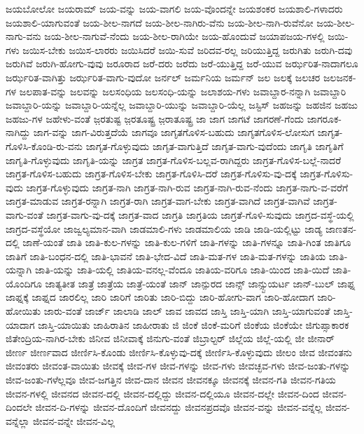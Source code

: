 {ಜಯಬೋಲೋ
ಜಯರಾಮ್
ಜಯ-ವನ್ನು
ಜಯ-ವಾಗಲಿ
ಜಯ-ವೊಂದನ್ನೇ
ಜಯಶಂಕರ
ಜಯಶಾಲಿ-ಗಳಾದರು
ಜಯಶಾಲಿ-ಯಾಗುವಂತೆ
ಜಯ-ಶೀಲ-ನಾಗದೆ
ಜಯ-ಶೀಲ-ನಾಗಿರು-ವೆನು
ಜಯ-ಶೀಲ-ನಾಗಿ-ರುವೆನೋ
ಜಯ-ಶೀಲ-ನಾಗು-ವನು
ಜಯ-ಶೀಲ-ನಾಗುವೆ-ನೆಂದು
ಜಯ-ಶೀಲ-ರಾಗಿಯೇ
ಜಯ-ಹೊಂದುವೆ
ಜಯಾಪಜಯ-ಗಳಲ್ಲಿ
ಜಯಿ-ಗಳು
ಜಯಿಸ-ಬೇಕು
ಜಯಿಸ-ಲಾರರು
ಜಯಿಸಿದರೆ
ಜಯಿ-ಸುವೆ
ಜರಿದವ-ರಲ್ಲ
ಜರಿಯುತ್ತಿದ್ದ
ಜರುಗಿತು
ಜರುಗಿ-ದವು
ಜರುಗಿವೆ
ಜರುಗಿ-ಹೋಗು-ವುವು
ಜರೂರಾದ
ಜರೆ-ದರು
ಜರೆದು
ಜರೆ-ಯುತ್ತಿದ್ದ
ಜರೆ-ಯುವ
ಜರ್ಝರಿತ-ನಾದಾಗಲೂ
ಜರ್ಝರಿತ-ವಾಗಿತ್ತು
ಜರ್ಝರಿತ-ವಾಗು-ವುದೋ
ಜರ್ನಲ್
ಜರ್ಮನಿಯ
ಜರ್ಮನ್
ಜಲ
ಜಲಕ್ಕೆ
ಜಲಚರ
ಜಲಜನಕ-ಗಳ
ಜಲಪಾತ-ವನ್ನು
ಜಲವನ್ನು
ಜಲಸಂಧಿಯ
ಜಲಸಂಧಿ-ಯನ್ನು
ಜಲಾಶಯ-ಗಳು
ಜವಾಬ್ದಾರ-ನನ್ನಾಗಿ
ಜವಾಬ್ದಾರಿ
ಜವಾಬ್ದಾರಿ-ಯನ್ನು
ಜವಾಬ್ದಾರಿ-ಯನ್ನೆಲ್ಲ
ಜವಾಬ್ದಾರಿ-ಯುನ್ನು
ಜವಾಬ್ದಾರಿ-ಯೆಲ್ಲ
ಜಸ್ಟಿಸ್
ಜಹಜನ್ನು
ಜಹಜಿನ
ಜಹಜು
ಜಹಜು-ಗಳ
ಜಹೇಳು-ವಂತೆ
ಜ಼ರತುಷ್ಟ
ಜ಼ರತೂಷ್ಟ್ರ
ಜ಼ರಾತೂಷ್ಟ್ರ
ಜಾ
ಜಾಗ
ಜಾಗಟೆ
ಜಾಗರಣೆ-ಗೆಂದು
ಜಾಗರೂಕ-ನಾಗಿದ್ದು
ಜಾಗ-ವನ್ನು
ಜಾಗ-ವಿರುತ್ತದೆಯೆ
ಜಾಗವೂ
ಜಾಗೃತಗೊಳಿಸ-ಬಹುದು
ಜಾಗೃತಗೊಳಿಸ-ಲೋಸುಗ
ಜಾಗೃತ-ಗೊಳಿಸಿ-ಕೊಂಡಿ-ರು-ವನು
ಜಾಗೃತ-ಗೊಳ್ಳುವುದು
ಜಾಗೃತ-ವಾಗುತ್ತಿದೆ
ಜಾಗೃತ-ವಾಗು-ವುದೆಂದು
ಜಾಗೃತಿ
ಜಾಗೃತಿಗೆ
ಜಾಗೃತಿ-ಗೊಳ್ಳುವುದು
ಜಾಗೃತಿ-ಯನ್ನು
ಜಾಗ್ರತ
ಜಾಗ್ರತ-ಗೊಳಿಸ-ಬಲ್ಲವ-ರಾಗಿದ್ದರು
ಜಾಗ್ರತ-ಗೊಳಿಸ-ಬಲ್ಲೆ-ನಾದರೆ
ಜಾಗ್ರತ-ಗೊಳಿಸ-ಬಹುದು
ಜಾಗ್ರತ-ಗೊಳಿಸ-ಬೇಕು
ಜಾಗ್ರತ-ಗೊಳಿಸಿ-ದರೆ
ಜಾಗ್ರತ-ಗೊಳಿಸು-ವು-ದಕ್ಕೆ
ಜಾಗ್ರತ-ಗೊಳಿಸು-ವುದು
ಜಾಗ್ರತ-ಗೊಳ್ಳುವುದು
ಜಾಗ್ರತ-ನಾಗಿ
ಜಾಗ್ರತ-ನಾಗಿ-ರುವ
ಜಾಗ್ರತ-ನಾಗಿ-ರುವ-ನೆಂದು
ಜಾಗ್ರತ-ನಾಗು-ವ-ವರೆಗೆ
ಜಾಗ್ರತ-ಮಾಡುವ
ಜಾಗ್ರತ-ರನ್ನಾಗಿ
ಜಾಗ್ರತ-ರಾಗಿ
ಜಾಗ್ರತ-ವಾಗ-ಬೇಕು
ಜಾಗ್ರತ-ವಾಗಿದೆ
ಜಾಗ್ರತ-ವಾಗಿವೆ
ಜಾಗ್ರತ-ವಾಗು-ವಂತೆ
ಜಾಗ್ರತ-ವಾಗು-ವು-ದಕ್ಕೆ
ಜಾಗ್ರತ-ವಾದ
ಜಾಗ್ರತಿ
ಜಾಗ್ರತಿಯ
ಜಾಗ್ರತೆ-ಗೊಳಿ-ಸುವುದು
ಜಾಗ್ರದ-ವಸ್ಥೆ-ಯಲ್ಲಿ
ಜಾಗ್ರದ-ವಸ್ಥೆಯೋ
ಜಾಜ್ವಲ್ಯಮಾನ-ವಾಗಿ
ಜಾಡಮಾಲಿ-ಗಳು
ಜಾಡಮಾಲಿಯ
ಜಾಡಿ
ಜಾಡಿ-ಯಲ್ಲಿಟ್ಟು
ಜಾಡ್ಯ
ಜಾಣತನ-ದಲ್ಲಿ
ಜಾಣೆ-ಯಂತೆ
ಜಾತಿ
ಜಾತಿ-ಕುಲ-ಗಳನ್ನು
ಜಾತಿ-ಕುಲ-ಗಳಿಗೆ
ಜಾತಿ-ಗಳನ್ನು
ಜಾತಿ-ಗಳನ್ನೂ
ಜಾತಿ-ಗಿಂತ
ಜಾತಿಗೂ
ಜಾತಿಗೆ
ಜಾತಿ-ಬಂಧನ-ದಲ್ಲಿ
ಜಾತಿ-ಭಾವನೆ
ಜಾತಿ-ಭೇದ-ವಿದೆ
ಜಾತಿ-ಮತ-ಗಳ
ಜಾತಿ-ಮತ-ಗಳನ್ನು
ಜಾತಿಯ
ಜಾತಿ-ಯನ್ನಾಗಿ
ಜಾತಿ-ಯನ್ನು
ಜಾತಿ-ಯಲ್ಲಿ
ಜಾತಿಯ-ವನಲ್ಲ-ವೆಂದೂ
ಜಾತಿಯ-ವರಿಗೂ
ಜಾತಿ-ಯಿಂದ
ಜಾತಿ-ಯಿದೆ
ಜಾತಿ-ಯೊಂದಿಗೂ
ಜಾತ್ಯತೀತ
ಜಾತ್ರೆ
ಜಾತ್ರೆಯ
ಜಾತ್ರೆ-ಯಂತೆ
ಜಾನ್
ಜಾನ್ಪುರದ
ಜಾನ್ಸ್
ಜಾನ್ಸ್ಟುಯರ್ಟ
ಜಾನ್-ಬುಲ್
ಜಾಫ್ನ
ಜಾಫ್ನಕ್ಕೆ
ಜಾಫ್ನದ
ಜಾರಲಿಲ್ಲ
ಜಾರಿ
ಜಾರಿಗೆ
ಜಾರಿತು
ಜಾರಿ-ಬಿದ್ದು
ಜಾರಿ-ಹೋಗು-ವಾಗ
ಜಾರಿ-ಹೋದಾಗ
ಜಾರಿ-ಹೋಯಿತು
ಜಾರು-ವಂತೆ
ಜಾರ್ಜ್
ಜಾಲಾಡಿ
ಜಾಲ್
ಜಾವ
ಜಾವದ
ಜಾಸ್ತಿ
ಜಾಸ್ತಿ-ಯಾಗಿ
ಜಾಸ್ತಿ-ಯಾಗುವಂತೆ
ಜಾಸ್ತಿ-ಯಾದಾಗ
ಜಾಸ್ತಿ-ಯಾಯಿತು
ಜಾಹಿರಾತಿನ
ಜಾಹೀರಾತು
ಜಿ
ಜಿಂಕೆ
ಜಿಂಕೆ-ಮರಿಗೆ
ಜಿಂಕೆಯ
ಜಿಂಕೆಯೇ
ಜಿಗುಪ್ಸಾಕಾರಕ
ಜಿತೇಂದ್ರಿಯ-ನಾಗಿರ-ಬೇಕು
ಜಿನೀವ
ಜಿನೀವಾಕ್ಕೆ
ಜಿನುಗು-ವಂತೆ
ಜಿಬ್ರಾಲ್ಟರ್
ಜಿಲ್ಲೆಯ
ಜಿಲ್ಲೆ-ಯಲ್ಲಿ
ಜೀ
ಜೀನಾರ್
ಜೀರ್ಣ
ಜೀರ್ಣವಾದ
ಜೀರ್ಣಿಸಿ-ಕೊಂಡು
ಜೀರ್ಣಿಸಿ-ಕೊಳ್ಳುವು-ದಕ್ಕೆ
ಜೀರ್ಣಿಸಿ-ಕೊಳ್ಳುವುದು
ಜೀಲಂ
ಜೀವ
ಜೀವಂತನು
ಜೀವಂತರು
ಜೀವಂತ-ವಾಯಿತು
ಜೀವಕ್ಕೆ
ಜೀವ-ಗಳ
ಜೀವ-ಗಳನ್ನು
ಜೀವ-ಗಳು
ಜೀವಚ್ಛವ-ಗಳು
ಜೀವ-ಜಂತು-ಗಳನ್ನು
ಜೀವ-ಜಂತು-ಗಳೆಲ್ಲವೂ
ಜೀವ-ಜಗತ್ತಿನ
ಜೀವ-ದಾನ
ಜೀವನ
ಜೀವನಕ್ಕೂ
ಜೀವನಕ್ಕೆ
ಜೀವನ-ಗತಿ
ಜೀವನ-ಗತಿಯ
ಜೀವನ-ಗಳಲ್ಲಿ
ಜೀವನದ
ಜೀವನ-ದಲ್ಲಿ
ಜೀವನ-ದಲ್ಲಿದ್ದು
ಜೀವನ-ದಲ್ಲಿಯೂ
ಜೀವನ-ದಲ್ಲೇ
ಜೀವನ-ದಿಂದ
ಜೀವನ-ದಿಂದಲೇ
ಜೀವನ-ದಿ-ಗಳನ್ನು
ಜೀವನ-ದೊಂದಿಗೆ
ಜೀವನದ್ದು
ಜೀವನಪ್ರದವೊ
ಜೀವನ-ವನ್ನು
ಜೀವನ-ವನ್ನೆಲ್ಲ
ಜೀವನ-ವನ್ನೆಲ್ಲಾ
ಜೀವನ-ವನ್ನೇ
ಜೀವನ-ವಿಲ್ಲ
}
